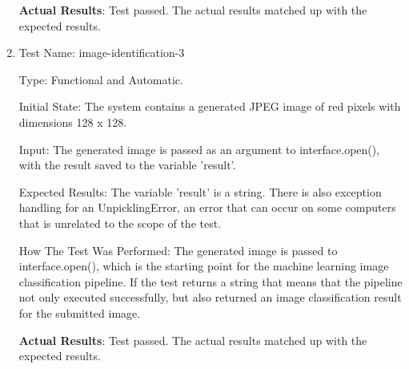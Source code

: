 \documentclass[12pt, titlepage]{article}
\begin{document}
\begin{enumerate}
		\textbf{Actual Results}: Test passed. The actual results matched up with the expected results.
		
        \item{Test Name: image-identification-3}
        
        Type: Functional and Automatic.
		
		Initial State: The system contains a generated JPEG image of red pixels with dimensions 128 x 128.
		
		Input: The generated image is passed as an argument to interface.open(), with the result saved to the variable 'result'.
		
		Expected Results: The variable 'result' is a string. There is also exception handling for an UnpicklingError, an error that can occur on some computers that is unrelated to the scope of the test.
		
		How The Test Was Performed: The generated image is passed to interface.open(), which is the starting point for the machine learning image classification pipeline. If the test returns a string that means that the pipeline not only executed successfully, but also returned an image classification result for the submitted image.
		
		\textbf{Actual Results}: Test passed. The actual results matched up with the expected results.
		
	\end{enumerate}
		
\end{document}
